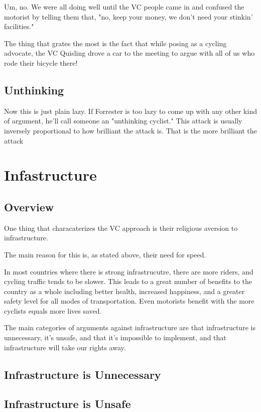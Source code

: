 Um, no. We were all doing well until the VC people came in and confused the motorist by telling them that, "no, keep your money, we don't need your stinkin' facilities."

The thing that grates the most is the fact that while posing as a cycling advocate, the VC Quisling drove a car to the meeting to argue with all of us who rode their bicycle there!

\subsection{Unthinking} 

Now this is just plain lazy. If Forrester is too lazy to come up with any other kind of argument, he'll call someone an "unthinking cyclist." This attack is usually inversely proportional to how brilliant the attack is. That is the more brilliant the attack

\section{Infastructure} 

\subsection{Overview} 

One thing that characaterizes the VC approach is their religious aversion to infrastructure.

The main reason for this is, as stated above, their need for speed.

In most countries where there is strong infrastrucutre, there are more riders,
and cycling traffic tends to be slower. This leads to a great number of
benefits to the country as a whole including better health, increased
happiness, and a greater safety level for all modes of transportation. Even
motorists benefit with the more cyclists equals more lives saved.

The main categories of arguments against infrastructure are that infrastructure is unnecessary, it's unsafe, and that it's impossible to implement, and that infrastructure will take our rights away.

\subsection{Infrastructure is Unnecessary}

\subsection{Infrastructure is Unsafe}

